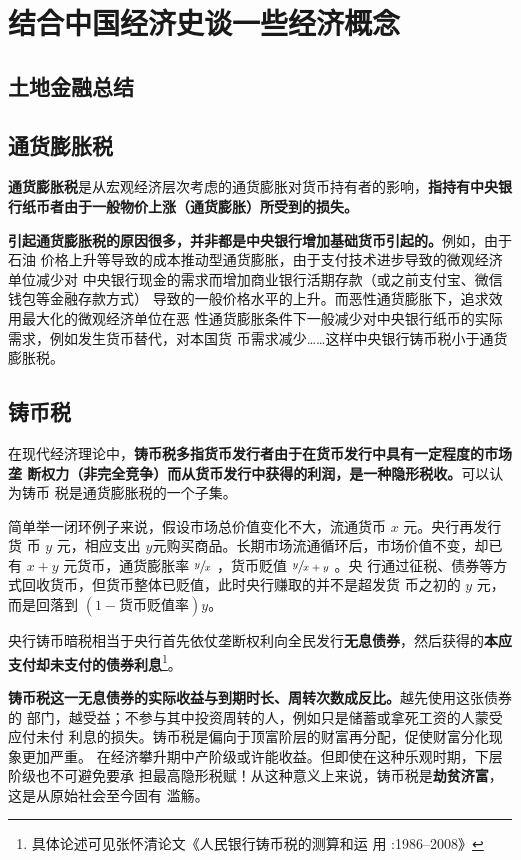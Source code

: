 \chapter{结合中国经济史谈一些经济概念}

\section{土地金融总结}


\section{通货膨胀税}

\textbf{通货膨胀税}是从宏观经济层次考虑的通货膨胀对货币持有者的影响，\textbf{指持有中央银
  行纸币者由于一般物价上涨（通货膨胀）所受到的损失。}

\textbf{引起通货膨胀税的原因很多，并非都是中央银行增加基础货币引起的。}例如，由于石油
价格上升等导致的成本推动型通货膨胀，由于支付技术进步导致的微观经济单位减少对
中央银行现金的需求而增加商业银行活期存款（或之前支付宝、微信钱包等金融存款方式）
导致的一般价格水平的上升。而恶性通货膨胀下，追求效用最大化的微观经济单位在恶
性通货膨胀条件下一般减少对中央银行纸币的实际需求，例如发生货币替代，对本国货
币需求减少……这样中央银行铸币税小于通货膨胀税。

\section{铸币税}

在现代经济理论中，\textbf{铸币税多指货币发行者由于在货币发行中具有一定程度的市场垄
  断权力（非完全竞争）而从货币发行中获得的利润，是一种隐形税收。}可以认为铸币
税是通货膨胀税的一个子集。

简单举一闭环例子来说，假设市场总价值变化不大，流通货币 $x$ 元。央行再发行货
币 $y$ 元，相应支出 $y$元购买商品。长期市场流通循环后，市场价值不变，却已
有 $x+y$ 元货币，通货膨胀率 $ \sfrac{y}{x}$ ，货币贬值 $\sfrac{y}{x+y}$ 。央
行通过征税、债券等方式回收货币，但货币整体已贬值，此时央行赚取的并不是超发货
币之初的 $y$ 元，而是回落到 $(1 - 货币贬值率)y$。


央行铸币暗税相当于央行首先依仗垄断权利向全民发行\textbf{无息债券}，然后获得的\textbf{本应
  支付却未支付的债券利息}\footnote{具体论述可见张怀清论文《人民银行铸币税的测算和运
  用 :1986--2008》}。

\textbf{铸币税这一无息债券的实际收益与到期时长、周转次数成反比。}越先使用这张债券的
部门，越受益；不参与其中投资周转的人，例如只是储蓄或拿死工资的人蒙受应付未付
利息的损失。铸币税是偏向于顶富阶层的财富再分配，促使财富分化现象更加严重。
在经济攀升期中产阶级或许能收益。但即使在这种乐观时期，下层阶级也不可避免要承
担最高隐形税赋！从这种意义上来说，铸币税是\textbf{劫贫济富}，这是从原始社会至今固有
滥觞。

